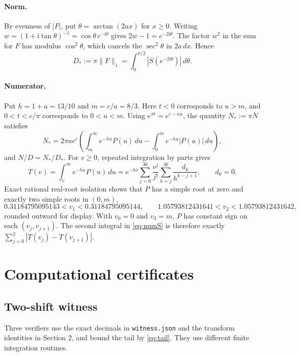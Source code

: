 \documentclass[11pt]{article}
\newcommand{\ii}{\mathrm i}
\begin{document}
\paragraph{Norm.} By evenness of $|F|$, put $\theta=\arctan(2ax)$ for
$x\ge0$. Writing $w=(1+\ii\tan\theta)^{-1}=\cos\theta\,e^{-\ii\theta}$ gives
$2w-1=e^{-2\ii\theta}$. The factor $w^2$ in the sum for $F$ has modulus
$\cos^2\theta$, which cancels the $\sec^2\theta$ in $2a\,dx$. Hence
\begin{equation}
 D_*:=\pi\|F\|_1=\int_0^{\pi/2}|S(e^{-2\ii\theta})|\,d\theta. \label{eq:normS}
\end{equation}

\paragraph{Numerator.} Put $h=1+a=13/10$ and $m=c/a=8/3$. Here $t<0$
corresponds to $u>m$, and $0<t<c/\pi$ corresponds to $0<u<m$. Using
$e^{\pi t}=e^{c-au}$, the quantity $N_*:=\pi N$ satisfies
\begin{equation}
 N_*=2\pi a e^c\left(\int_m^\infty e^{-hu}P(u)\,du-
                    \int_0^m e^{-hu}|P(u)|\,du\right), \label{eq:numS}
\end{equation}
and $N/D=N_*/D_*$. For $v\ge0$, repeated integration by parts gives
\[
 T(v)=\int_v^\infty e^{-hu}P(u)\,du
     =e^{-hv}\sum_{j=0}^{36}\frac{v^j}{j!}
                    \sum_{k=j}^{36}\frac{d_k}{h^{k-j+1}},
 \qquad d_0=0.
\]
Exact rational real-root isolation shows that $P$ has a simple root at
zero and exactly two simple roots in $(0,m)$,
\[
 0.31184795095143<v_1<0.31184795095144,\qquad
 1.05793812431641<v_2<1.05793812431642,
\]
rounded outward for display. With $v_0=0$ and $v_3=m$, $P$ has constant
sign on each $(v_j,v_{j+1})$. The second integral in \eqref{eq:numS} is
therefore exactly $\sum_{j=0}^{2}|T(v_j)-T(v_{j+1})|$.

\section{Computational certificates}

\subsection*{Two-shift witness}
Three verifiers use the exact decimals in \texttt{witness.json} and
the transform identities in Section 2, and bound the tail by
\eqref{eq:tail}. They use different finite integration routines.
\end{document}
